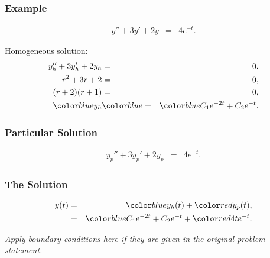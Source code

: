 \begin{frame}
  \frametitle{Example}

  \begin{eqnarray*}
    y'' + 3y' + 2y & = & 4 e^{-t}.
  \end{eqnarray*}

  {
    Homogeneous solution:
    \begin{eqnarray*}
      y_h'' + 3y_h' + 2y_h & = &  0, \\
      r^2 + 3r + 2 & = & 0, \\
      (r+2)(r+1) & = & 0, \\
      \blueText{y_h} & \blueText{=} & \blueText{C_1 e^{-2t} + C_2 e^{-t}}.
    \end{eqnarray*}
  }

\end{frame}

\begin{frame}
  \frametitle{Particular Solution}


  \begin{eqnarray*}
    y_p'' + 3y_p' + 2y_p & = & 4 e^{-t}.
  \end{eqnarray*}



\end{frame}

\begin{frame}
  \frametitle{The Solution}

  \begin{eqnarray*}
    y(t) & = & \blueText{y_h(t)} + \redText{y_p(t)}, \\
         & = & \blueText{C_1 e^{-2t} + C_2 e^{-t}} + \redText{4te^{-t}}.
  \end{eqnarray*}

  \textit{Apply boundary conditions here if they are given in the original problem statement.}

\end{frame}

